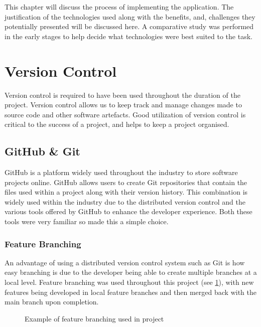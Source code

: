 This chapter will discuss the process of implementing the application. The justification of the technologies used along with the benefits, and, challenges they potentially presented will be discussed here. A comparative study \cite{compStudy} was performed in the early stages to help decide what technologies were best suited to the task.

\section{Version Control}
Version control is required to have been used throughout the duration of the project. Version control allows us to keep track and manage changes made to source code and other software artefacts. Good utilization of version control is critical to the success of a project, and helps to keep a project organised.
\subsection{GitHub \& Git}
GitHub \cite{github} is a platform widely used throughout the industry to store software projects online. GitHub allows users to create Git repositories \cite{git} that contain the files used within a project along with their version history. This combination is widely used within the industry due to the distributed version control and the various tools offered by GitHub to enhance the developer experience. Both these tools were very familiar so made this a simple choice. 
\subsubsection{Feature Branching}
An advantage of using a distributed version control system such as Git is how easy branching is due to the developer being able to create multiple branches at a local level. Feature branching was used throughout this project (see \ref{fig:branching}), with new features being developed in local feature branches and then merged back with the main branch upon completion.  
\begin{figure}[!htbp]
    \centering
    \begin{subfigure}[b]{0.90\textwidth}
    \end{subfigure}
    \caption{Example of feature branching used in project}
    \label{fig:branching}
\end{figure}
